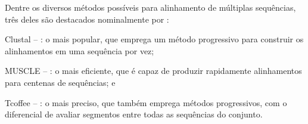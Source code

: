 \documentclass[english,brazilian]{UNISINOSmonografia} %
\begin{document}
%
%
%
%

Dentre os diversos métodos possíveis para alinhamento de múltiplas sequências, três deles são destacados nominalmente por :
 \begin{inparaenum} 
	\item Clustal -- \cite{Sievers2014}: o mais popular, que emprega um método progressivo para construir os alinhamentos em uma sequência por vez;
	\item MUSCLE -- \cite{Edgar2004}: o mais eficiente, que é capaz de produzir rapidamente alinhamentos para centenas de sequências; e
	\item Tcoffee -- \cite{Notredame2000}: o mais preciso, que também emprega métodos progressivos, com o diferencial de avaliar segmentos entre todas as sequências do conjunto.
\end{inparaenum}
\end{document}
